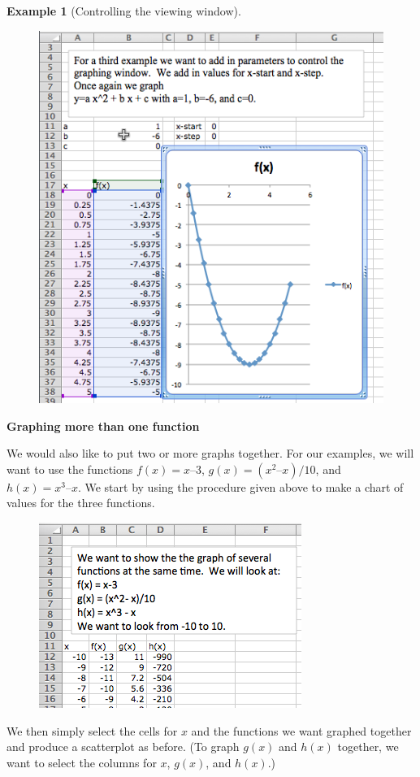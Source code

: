 \documentclass[10pt,]{book}
\newcommand{\terminology}[1]{\textbf{#1}}
\theoremstyle{plain}
\theoremstyle{definition}
\newtheorem{example}[theorem]{Example}
\theoremstyle{definition}
\begin{document}
\begin{example}[Controlling the viewing window]
\begin{figure}
\includegraphics[width=0.8\linewidth]{images/sec1-4-9.png}
\end{figure}
\end{example}
\par
\terminology{Graphing more than one function}%
\par
We would also like to put two or more graphs together.  For our examples, we will want to use the functions \(f(x) = x – 3\), \(g(x) = (x^2 – x)/10\), and \(h(x) = x^3 – x\).  We start by using the procedure given above to make a chart of values for the three functions.%
\leavevmode%
\begin{figure}
\centering
\includegraphics[width=0.6\linewidth]{images/sec1-4-10.png}
\end{figure}
\par
We then simply select the cells for \(x\) and the functions we want graphed together and produce a scatterplot as before.  (To graph \(g(x)\) and \(h(x)\) together, we want to select the columns for \(x\), \(g(x)\), and \(h(x)\).)%
\end{document}
